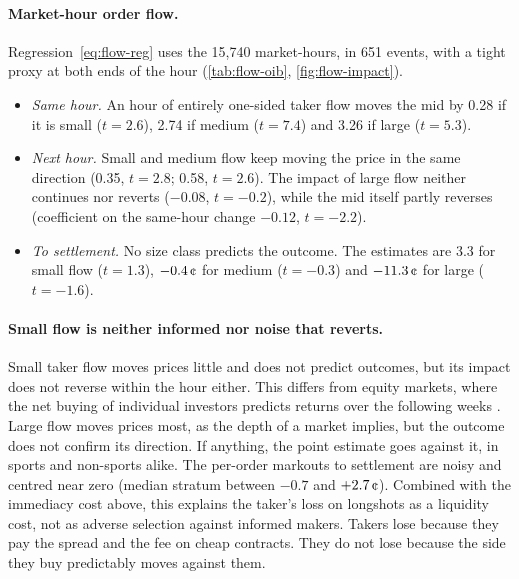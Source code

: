\paragraph{Market-hour order flow.} Regression~\eqref{eq:flow-reg} uses the 15,740
market-hours, in 651 events, with a tight proxy at both ends of the hour (\cref{tab:flow-oib},
\cref{fig:flow-impact}).
\begin{itemize}
  \item \emph{Same hour.} An hour of entirely one-sided taker flow moves the mid by 0.28\cents{}
  if it is small ($t=2.6$), 2.74\cents{} if medium ($t=7.4$) and 3.26\cents{} if large
  ($t=5.3$).
  \item \emph{Next hour.} Small and medium flow keep moving the price in the same direction
  (0.35\cents, $t=2.8$; 0.58\cents, $t=2.6$). The impact of large flow neither continues nor
  reverts ($-0.08$\cents, $t=-0.2$), while the mid itself partly reverses (coefficient on the
  same-hour change $-0.12$, $t=-2.2$).
  \item \emph{To settlement.} No size class predicts the outcome. The estimates are 3.3\cents{}
  for small flow ($t=1.3$), $-0.4\cents$ for medium ($t=-0.3$) and $-11.3\cents$ for large
  ($t=-1.6$).
\end{itemize}

\paragraph{Small flow is neither informed nor noise that reverts.} Small taker flow moves prices
little and does not predict outcomes, but its impact does not reverse within the hour either.
This differs from equity markets, where the net buying of individual investors predicts
returns over the following weeks \citep{kanielsaartitman2008,boehmer2021}.
Large flow moves prices most, as the depth of a \citet{kyle1985} market implies, but the
outcome does not confirm its direction. If anything, the point estimate goes against it, in
sports and non-sports alike. The per-order markouts to settlement are noisy and centred near
zero (median stratum between $-0.7$ and $+2.7\cents$). Combined with the immediacy cost above,
this explains the taker's loss on longshots as a liquidity cost, not as adverse selection
against informed makers. Takers lose because they pay the spread and the fee on cheap
contracts. They do not lose because the side they buy predictably moves against them.

